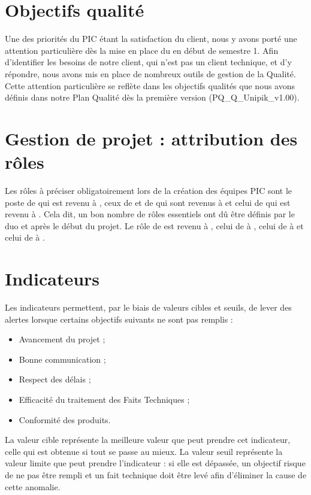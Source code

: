 \documentclass[asi]{picInsa}
\begin{document}
\section{Objectifs qualité}
Une des priorités du PIC étant la satisfaction du client, nous y avons porté une attention particulière dès la mise en place du \SMQ{} en début de semestre 1. Afin d’identifier les besoins de notre client, qui n'est pas un client technique, et d'y répondre, nous avons mis en place de nombreux outils de gestion de la Qualité. Cette attention particulière se reflète dans les objectifs qualités que nous avons définis dans notre Plan Qualité dès la première version (PQ\_Q\_Unipik\_v1.00).


\section{Gestion de projet : attribution des rôles}
Les rôles à préciser obligatoirement lors de la création des équipes PIC sont le poste de \CP{} qui est revenu à \Sergi{}, ceux de \CPA{} et de \RQ{} qui sont revenus à \Pierre{} et celui de \RQA{} qui est revenu à \Kafui{}. Cela dit, un bon nombre de rôles essentiels ont dû être définis par le duo \CP{} et \RQ{} après le début du projet. Le rôle de \RGC{} est revenu à \Mathieu{}, celui de \RD{} à \Michel, celui de \RRS{} à \Matthieu{} et celui de \RS{} à \Florian{}.

\section{Indicateurs}
Les indicateurs permettent, par le biais de valeurs cibles et seuils, de lever des alertes lorsque certains objectifs suivants ne sont pas remplis :
\begin{itemize}
\item Avancement du projet ;
\item Bonne communication ;
\item Respect des délais ;
\item Efficacité du traitement des Faits Techniques ;
\item Conformité des produits.
\end{itemize}
La valeur cible représente la meilleure valeur que peut prendre cet indicateur, celle qui est obtenue si tout se passe au mieux. La valeur seuil représente la valeur limite que peut prendre l’indicateur : si elle est dépassée, un objectif risque de ne pas être rempli et un fait technique doit être levé afin d’éliminer la cause de cette anomalie.
\end{document}

